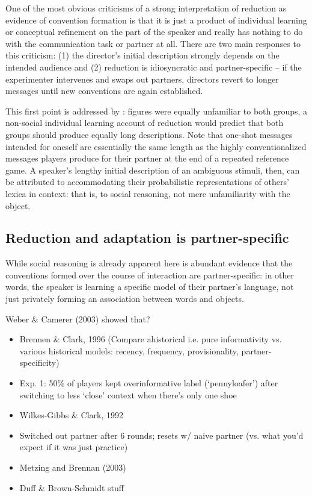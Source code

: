 \documentclass[11pt, floatsintext, jou]{apa6}
\begin{document}
One of the most obvious criticisms of a strong interpretation of reduction as evidence of convention formation is that it is just a product of individual learning or conceptual refinement on the part of the speaker and really has nothing to do with the communication task or partner at all. There are two main responses to this criticism: (1) the director's initial description strongly depends on the intended audience and (2) reduction is idiosyncratic and partner-specific -- if the experimenter intervenes and swaps out partners, directors revert to longer messages until new conventions are again established. 

This first point is addressed by : figures were equally unfamiliar to both groups, a non-social individual learning account of reduction would predict that both groups should produce equally long descriptions. Note that one-shot messages intended for oneself are essentially the same length as the highly conventionalized messages players produce for their partner at the end of a repeated reference game. A speaker's lengthy initial description of an ambiguous stimuli, then, can be attributed to accommodating their probabilistic representations of others' lexica in context: that is, to social reasoning, not mere unfamiliarity with the object.

\subsection{Reduction and adaptation is partner-specific}

While social reasoning is already apparent here is abundant evidence that the conventions formed over the course of interaction are partner-specific: in other words, the speaker is learning a specific model of their partner's language, not just privately forming an association between words and objects. 

Weber \& Camerer (2003) showed that? 

\begin{itemize}
\item Brennen \& Clark, 1996 (Compare ahistorical i.e. pure informativity vs. various historical models: recency, frequency, provisionality, partner-specificity)
\item Exp. 1: 50\% of players kept overinformative label (`pennyloafer') after switching to less `close' context when there's only one shoe
\item Wilkes-Gibbs \& Clark, 1992
\item Switched out partner after 6 rounds; resets w/ naive partner (vs. what you'd expect if it was just practice)
\item Metzing and Brennan (2003)
\item Duff \& Brown-Schmidt stuff
\end{itemize}
\end{document}
